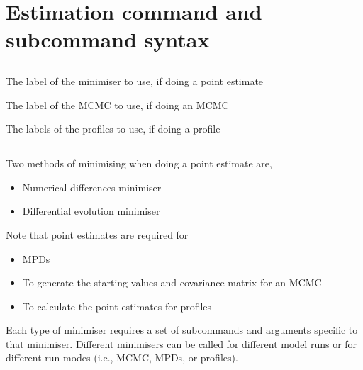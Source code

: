 \section{Estimation command and subcommand syntax\label{sec:estimation-syntax}}

\subsection{}


 {The label of the minimiser to use, if doing a point estimate}

 {The label of the MCMC to use, if doing an MCMC}

 {The labels of the profiles to use, if doing a profile}

\subsection{}

Two methods of minimising when doing a point estimate are,

\begin{itemize}
	\item Numerical differences minimiser
  \item Differential evolution minimiser
\end{itemize}

Note that point estimates are required for

\begin{itemize}
  \item MPDs
  \item To generate the starting values and covariance matrix for an MCMC
  \item To calculate the point estimates for profiles
\end{itemize}

Each type of minimiser requires a set of subcommands and arguments specific to that minimiser. Different minimisers can be called for different model runs or for different run modes (i.e., MCMC, MPDs, or profiles).


